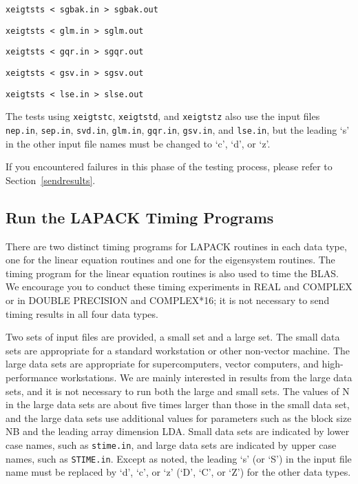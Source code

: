 \begin{itemize}
\begin{list}{}{}
\item {\tt xeigtsts  < sgbak.in > sgbak.out}
\item {\tt xeigtsts  < glm.in > sglm.out}
\item {\tt xeigtsts  < gqr.in > sgqr.out}
\item {\tt xeigtsts  < gsv.in > sgsv.out}
\item {\tt xeigtsts  < lse.in > slse.out}
\end{list}
The tests using {\tt xeigtstc}, {\tt xeigtstd}, and {\tt xeigtstz} also
use the input files {\tt nep.in}, {\tt sep.in}, {\tt svd.in},
{\tt glm.in}, {\tt gqr.in}, {\tt gsv.in}, and {\tt lse.in},
but the leading `s' in the other input file names must be changed
to `c', `d', or `z'.
\end{itemize}

If you encountered failures in this phase of the testing process, please
refer to Section~\ref{sendresults}.

\subsection{Run the LAPACK Timing Programs}

\dent
There are two distinct timing programs for LAPACK routines
in each data type, one for the linear equation routines and
one for the eigensystem routines.  The timing program for the
linear equation routines is also used to time the BLAS.
We encourage you to conduct these timing experiments
in REAL and COMPLEX or in DOUBLE PRECISION and COMPLEX*16; it is
not necessary to send timing results in all four data types.

Two sets of input files are provided, a small set and a large set.
The small data sets are appropriate for a standard workstation or
other non-vector machine.
The large data sets are appropriate for supercomputers, vector
computers, and high-performance workstations.
We are mainly interested in results from the large data sets, and
it is not necessary to run both the large and small sets.
The values of N in the large data sets are about five times larger
than those in the small data set,
and the large data sets use additional values for parameters such as the
block size NB and the leading array dimension LDA.
Small data sets are indicated by lower case names, such as
{\tt stime.in}, and large data sets are indicated by upper case names,
such as {\tt STIME.in}.
Except as noted, the leading `s' (or `S') in the input file name must be
replaced by `d', `c', or `z' (`D', `C', or `Z') for the other data types.

